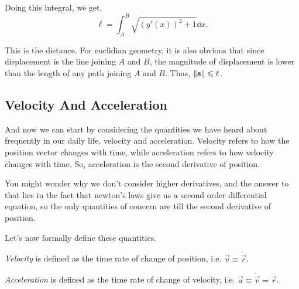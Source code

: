 Doing this integral, we get,
\begin{equation}
    \ell = \int_A^B \sqrt{(y'(x))^2 + 1} \dd{x}.
\end{equation}

This is the distance. For euclidian geometry, it is also obvious that since displacement is the line joining 
$A$ and $B$, the magnitude of displacement is lower than the length of any path joining $A$ and $B$. Thus,
$\norm{\mathbf{\boldsymbol{s}}} \leqslant \ell$. 

\subsection{Velocity And Acceleration}

And now we can start by considering the quantities we have heard about frequently
in our daily life, velocity and acceleration. Velocity refers to how the position
vector changes with time, while acceleration refers to how velocity changes with time.
So, acceleration is the second derivative of position. 

You might wonder why we don't consider higher derivatives, and the answer to that lies in the 
fact that newton's laws give us a second order differential equation, so the only 
quantities of concern are till the second derivative of position.

Let's now formally define these quantities.

\begin{definition}
    \textit{Velocity} is defined as the time rate of change of position, i.e. $\vec{v} \equiv \dot{\vec{r}}$.

    \textit{Acceleration} is defined as the time rate of change of velocity, i.e. $\vec{a} \equiv \dot{\vec{v}} = \ddot{\vec{r}}$. 
\end{definition}


